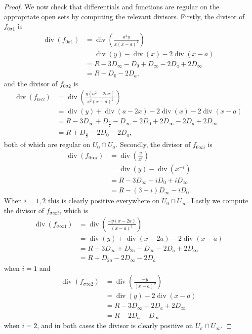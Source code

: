 \documentclass[draft, 11pt]{article} %
\theoremstyle{plain}
\theoremstyle{remark}
\DeclareMathOperator{\di}{div}
\begin{document}
\begin{proof}
We now check that differentials and functions are regular on the appropriate open sets by computing the relevant divisors.
Firstly, the divisor of $f_{0 \sigma 1}$ is
\begin{align*}
\di(f_{0 \sigma 1}) & = \di\left( \frac{a^2y}{x(x-a)^2} \right) \\ 
& = \di(y) - \di(x) - 2\di(x-a) \\
& = R - 3D_\infty - D_0 + D_\infty -2D_a +2D_\infty \\
& = R - D_0 - 2D_a,
\end{align*}
and the divisor of $f_{0 \sigma 2}$ is
\begin{align*}
\di(f_{0 \sigma 2} ) & = \di \left( \frac{y(a^2 - 2ax)}{x^2(x-a)^2} \right) \\
& = \di(y) + \di(a-2x) - 2\di(x) - 2\di(x-a) \\
& = R - 3D_\infty +D_{\frac{a}{2}} - D_\infty -2D_0 + 2D_\infty -2D_a + 2D_\infty \\
& = R + D_{\frac{a}{2}} - 2D_0 - 2D_a,
\end{align*}
both of which are regular on $U_0 \cap U_\sigma$.
Secondly, the divisor of $f_{0 \infty i}$ is
\begin{align*}
\di(f_{0 \infty i}) & = \di\left( \frac{y}{x^i} \right) \\
& = \di(y) - \di(x^{-i}) \\
& = R - 3D_\infty -iD_0 + iD_\infty \\
& = R - (3-i)D_\infty -iD_0.
\end{align*}
When $i = 1,2$ this is clearly positive everywhere on $U_0 \cap U_\infty$.
Lastly we compute the divisor of  $f_{\sigma \infty i}$, which is
\begin{align*}
\di(f_{\sigma \infty 1} ) & = \di \left( \frac{-y(x-2a)}{(x-a)^2} \right) \\
& = \di(y) + \di(x-2a) - 2\di(x-a) \\
& = R - 3D_\infty + D_{2a} - D_\infty - 2D_a + 2D_\infty \\
& = R + D_{2a} -2D_\infty - 2D_a
\end{align*}
when $i=1$ and
\begin{align*}
\di( f_{\sigma \infty 2} ) & = \di \left( \frac{-y}{(x-a)^2} \right) \\
& = \di (y)  - 2\di(x-a) \\
& = R - 3D_\infty  - 2D_a + 2D_\infty \\
& = R - 2D_a - D_\infty 
\end{align*}
when $i=2$, and in both cases the divisor is clearly positive on $U_\sigma \cap U_\infty$.


\end{proof}
\end{document}
